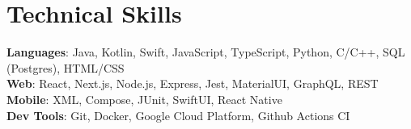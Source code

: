 \documentclass[letterpaper,11pt]{article}
\begin{document}
%
\section{Technical Skills}
 \begin{itemize}[leftmargin=0.15in, label={}]
    \small{\item{
     \textbf{Languages}{: Java, Kotlin, Swift, JavaScript, TypeScript, Python, C/C++, SQL (Postgres), HTML/CSS} \\
     \textbf{Web}{: React, Next.js, Node.js, Express, Jest, MaterialUI, GraphQL, REST} \\
     \textbf{Mobile}{: XML, Compose, JUnit, SwiftUI, React Native} \\
     \textbf{Dev Tools}{: Git, Docker, Google Cloud Platform, Github Actions CI}
    }}
 \end{itemize}


\end{document}
